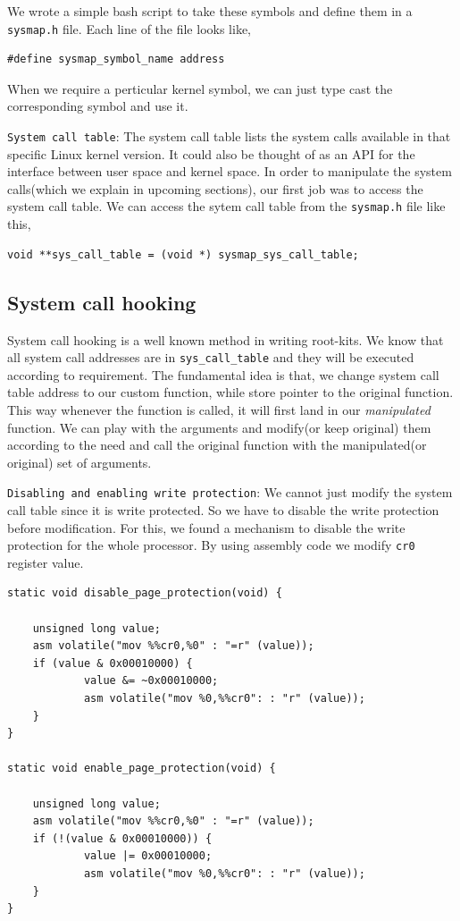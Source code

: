 \documentclass[10pt, letterpaper]{scrartcl}
\begin{document}
We wrote a simple bash script to take these symbols and define them in a \texttt{sysmap.h} file. 
Each line of the file looks like, 

\begin{verbatim}
#define sysmap_symbol_name address
\end{verbatim}

When we require a perticular kernel symbol, we can just type cast the corresponding symbol and use it. 

\texttt{System call table}: The system call table lists the system calls available in that specific Linux kernel version. 
It could also be thought of as an API for the interface between user space and kernel space. 
In order to manipulate the system calls(which we explain in upcoming sections), our first job was to access the system call table.
We can access the sytem call table from the \texttt{sysmap.h} file like this,

\begin{verbatim}
void **sys_call_table = (void *) sysmap_sys_call_table;
\end{verbatim}

\subsection{System call hooking}
System call hooking is a well known method in writing root-kits. 
We know that all system call addresses are in \texttt{sys\_call\_table} and they will be executed according to requirement.
The fundamental idea is that, we change system call table address to our custom function, 
while store pointer to the original function. This way whenever the function is called, 
it will first land in our {\em manipulated} function. 
We can play with the arguments and modify(or keep original) them according to the need and call the original function with the manipulated(or original) set of arguments. 

\texttt{Disabling and enabling write protection}: 
We cannot just modify the system call table since it is write protected. 
So we have to disable the write protection before modification.
For this, we found a mechanism to disable the write protection for the whole processor.
By using assembly code we modify \texttt{cr0} register value.

\begin{verbatim}
static void disable_page_protection(void) {

    unsigned long value;
    asm volatile("mov %%cr0,%0" : "=r" (value));
    if (value & 0x00010000) {
            value &= ~0x00010000;
            asm volatile("mov %0,%%cr0": : "r" (value));
    }
}

static void enable_page_protection(void) {

    unsigned long value;
    asm volatile("mov %%cr0,%0" : "=r" (value));
    if (!(value & 0x00010000)) {
            value |= 0x00010000;
            asm volatile("mov %0,%%cr0": : "r" (value));
    }
}
\end{verbatim}
\end{document}
